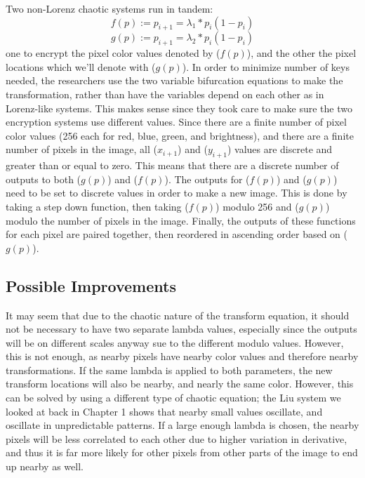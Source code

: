 Two non-Lorenz chaotic systems run in tandem: 
\begin{equation}
    f ( p ) := p_{i+1} = \lambda_{1} * p_{i} ( 1 - p_{i} )
\end{equation}
\begin{equation}
    g ( p ) := p_{i+1} = \lambda_{2} * p_{i} ( 1 - p_{i} )
\end{equation}
one to encrypt the pixel color values denoted by ($f(p)$), and the other the pixel locations which we'll denote with ($g(p)$).  In order to minimize number of keys needed, the researchers use the two variable bifurcation equations to make the transformation, rather than have the variables depend on each other as in Lorenz-like systems.  This makes sense since they took care to make sure the two encryption systems use different \textlambda values. Since there are a finite number of pixel color values (256 each for red, blue, green, and brightness), and there are a finite number of pixels in the image, all ($x_{i+1}$) and ($y_{i+1}$) values are discrete and greater than or equal to zero.  This means that there are a discrete number of outputs to both ($g(p)$) and ($f(p)$).  The outputs for ($f(p)$) and ($g(p)$) need to be set to discrete values in order to make a new image.  This is done by taking a step down function, then taking ($f(p)$) modulo 256 and ($g(p)$) modulo the number of pixels in the image.  Finally, the outputs of these functions for each pixel are paired together, then reordered in ascending order based on ($g(p)$).  

\subsection{Possible Improvements}

It may seem that due to the chaotic nature of the transform equation, it should not be necessary to have two separate lambda values, especially since the outputs will be on different scales anyway sue to the different modulo values.  However, this is not enough, as nearby pixels have nearby color values and therefore nearby transformations.  If the same lambda is applied to both parameters, the new transform locations will also be nearby, and nearly the same color.  However, this can be solved by using a different type of chaotic equation; the Liu system we looked at back in Chapter 1 shows that nearby small values oscillate, and oscillate in unpredictable patterns.  If a large enough lambda is chosen, the nearby pixels will be less correlated to each other due to higher variation in derivative, and thus it is far more likely for other pixels from other parts of the image to end up nearby as well.


